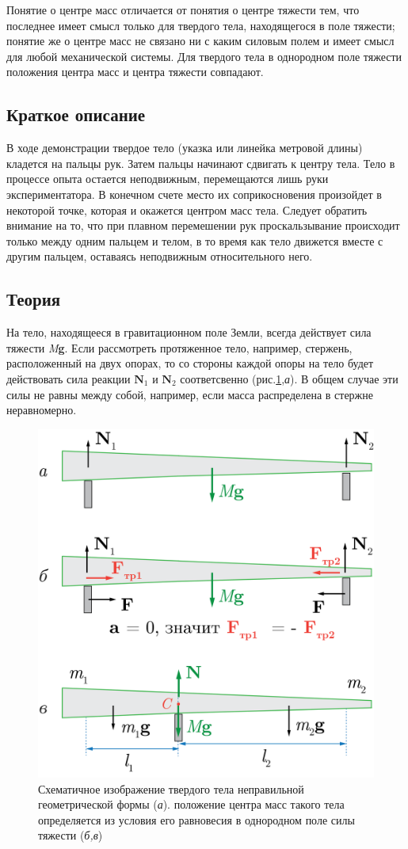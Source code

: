 \documentclass[All.tex]{subfiles}
\begin{document}
	Понятие о центре масс отличается от понятия о центре тяжести тем, 
	что последнее имеет смысл только для твердого тела, находящегося в поле тяжести;
	понятие же о центре масс не связано ни с каким силовым полем и имеет смысл для любой механической системы. 
	Для твердого тела в однородном поле тяжести положения центра масс и центра тяжести совпадают. 
	
\subsection*{\textcolor{PineGreen}{Краткое описание}}
	
В ходе демонстрации твердое тело (указка или линейка метровой длины) кладется на пальцы рук.
Затем пальцы начинают сдвигать к центру тела. Тело в процессе опыта остается неподвижным, перемещаются лишь руки экспериментатора.
В конечном счете место их соприкосновения произойдет в некоторой точке, которая и окажется центром масс тела.
Следует обратить внимание на то, что при плавном перемешении рук проскальзывание происходит только между одним пальцем и телом, в то время как тело движется вместе с другим пальцем, оставаясь неподвижным относительного него.

\subsection*{\textcolor{PineGreen}{Теория}}
		
		На тело, находящееся в гравитационном поле Земли, всегда действует сила тяжести \textit{M}\textbf{g}.
		Если рассмотреть протяженное тело, например, стержень, расположенный на двух опорах, то со стороны каждой опоры на тело будет действовать сила реакции $ \textbf{N}_1 $ и $ \textbf{N}_2 $ соответсвенно (рис.\ref{center-2},\textit{а}).
		В общем случае эти силы не равны между собой, например, если масса распределена в стержне неравномерно.
		
		\begin{figure}[H]
			\centering 	
			\includegraphics[width=0.55\linewidth]{center-2.png}
			\caption{Схематичное изображение твердого тела неправильной геометрической формы (\textit{а}). 
				положение центра масс такого тела определяется из условия его равновесия в однородном поле силы тяжести (\textit{б,в})}
			\label{center-2}
		\end{figure}
	
\end{document}
